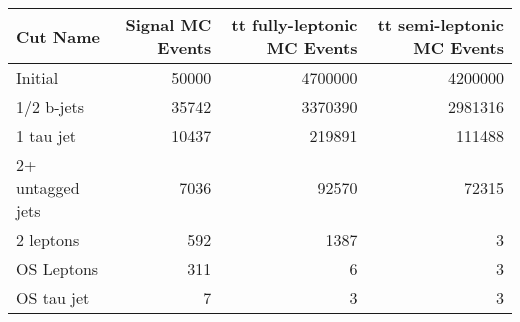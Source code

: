 \begin{tabular}{lrrr}
\toprule
         Cut Name &  Signal MC Events &  tt fully-leptonic MC Events &  tt semi-leptonic MC Events \\
\midrule
          Initial &             50000 &                      4700000 &                     4200000 \\
       1/2 b-jets &             35742 &                      3370390 &                     2981316 \\
        1 tau jet &             10437 &                       219891 &                      111488 \\
 2+ untagged jets &              7036 &                        92570 &                       72315 \\
        2 leptons &               592 &                         1387 &                           3 \\
       OS Leptons &               311 &                            6 &                           3 \\
       OS tau jet &                 7 &                            3 &                           3 \\
\bottomrule
\end{tabular}
